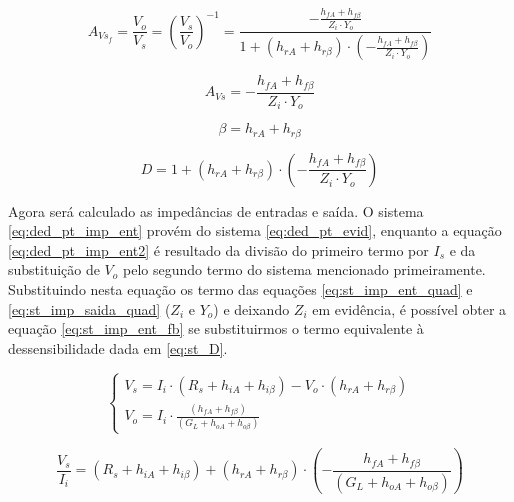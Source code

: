 \documentclass[openright]{normas-utf-tex} %
\begin{document}
\begin{equation}\label{eq:ded_pt_fb}
A_{Vs_f} = \frac{V_o}{V_s} = \left(\frac{V_s}{V_o}\right)^{-1} =
\frac{-\frac{h_{fA} + h_{f\beta} } {Z_i \cdot Y_o}} { 1 + \left(h_{rA} + h_{r\beta}\right) \cdot \left(-\frac{h_{fA} + h_{f\beta}} {Z_i \cdot Y_o} \right)}
\end{equation}

\begin{equation}\label{eq:st_amp_quad}
A_{Vs} = -\frac{h_{fA} + h_{f\beta}} {Z_i \cdot Y_o}
\end{equation}

\begin{equation}\label{eq:st_beta_quad}
\beta = h_{rA} + h_{r\beta}
\end{equation}

\begin{equation}\label{eq:st_D}
D = 1 + \left(h_{rA} + h_{r\beta}\right) \cdot \left(-\frac{h_{fA} + h_{f\beta}} {Z_i \cdot Y_o} \right)
\end{equation}

Agora será calculado as impedâncias de entradas e saída. O sistema \ref{eq:ded_pt_imp_ent} provém do sistema \ref{eq:ded_pt_evid}, enquanto a equação \ref{eq:ded_pt_imp_ent2} é resultado da divisão do primeiro termo por $I_s$ e da substituição de $V_o$ pelo segundo termo do sistema mencionado primeiramente. Substituindo nesta equação os termo das equações \ref{eq:st_imp_ent_quad} e \ref{eq:st_imp_saida_quad} ($Z_i$ e $Y_o$) e deixando $Z_i$ em evidência, é possível obter a equação \ref{eq:st_imp_ent_fb} se substituirmos o termo equivalente à dessensibilidade dada em \ref{eq:st_D}. \cite{pedroni,millman}

\begin{equation}\label{eq:ded_pt_imp_ent}
\begin{cases}
V_s = I_i \cdot \left( R_s + h_{iA} + h_{i\beta} \right) - V_o \cdot \left( h_{rA} + h_{r\beta} \right)

\\
V_o =  I_i \cdot \frac{\left( h_{fA} + h_{f\beta} \right)}{\left( G_L + h_{oA} + h_{o\beta} \right)}
\end{cases}
\end{equation}

\begin{equation}\label{eq:ded_pt_imp_ent2}
\frac{V_s}{I_i} = \left( R_s + h_{iA} + h_{i\beta} \right) + \left(h_{rA} + h_{r\beta}\right) \cdot \left(-\frac{h_{fA} + h_{f\beta}} {\left( G_L + h_{oA} + h_{o\beta} \right)} \right)
\end{equation}
\end{document}
